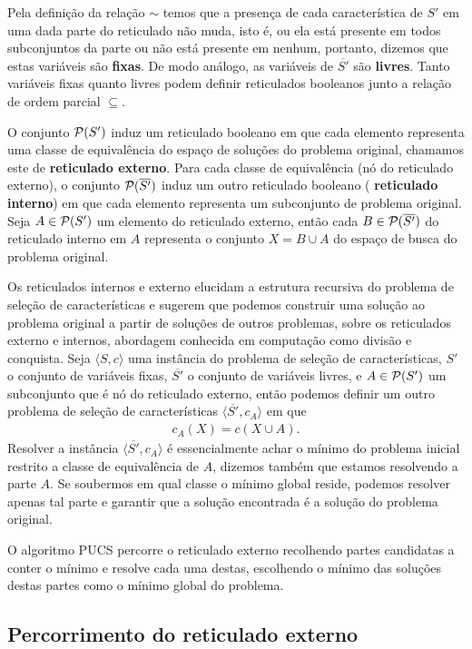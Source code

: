 Pela definição da relação $\sim$ temos que a presença de cada 
característica de $S'$ em uma dada parte do reticulado não muda, isto é,
ou ela está presente em todos subconjuntos da parte ou não está presente
em nenhum, portanto, dizemos que estas variáveis são {\bf fixas}. De 
modo análogo, as variáveis de $\overline{S'}$ são {\bf livres}. Tanto 
variáveis fixas quanto livres podem definir reticulados booleanos junto 
a relação de ordem parcial $\subseteq$.

O conjunto $\mathcal{P} (S')$ induz um reticulado booleano em que cada
elemento representa uma classe de equivalência do espaço de soluções
do problema original, chamamos este de {\bf reticulado externo}. Para 
cada classe de equivalência (nó do reticulado externo), o conjunto 
$\mathcal{P} (\overline {S'})$ induz um outro reticulado booleano ({\bf
reticulado interno}) em que cada elemento representa um subconjunto de
problema original. Seja $A \in \mathcal{P} (S')$ um elemento do reticulado 
externo, então cada $B \in \mathcal{P} (\overline{S'})$ do reticulado 
interno em $A$ representa o conjunto $X = B \cup A$ do espaço de busca
do problema original.

Os reticulados internos e externo elucidam a estrutura recursiva do 
problema de seleção de características e sugerem que podemos construir 
uma solução ao problema original a partir de soluções de outros 
problemas, sobre os reticulados externo e internos, abordagem conhecida
em computação como divisão e conquista. Seja $\langle S, c \rangle$ uma 
instância do problema de seleção de características, $S'$ o conjunto de 
variáveis fixas, $\overline{S'}$ o conjunto de variáveis livres, e 
$A \in \mathcal{P} (S')$ um subconjunto que é nó do reticulado externo, 
então podemos definir um outro problema de seleção de características 
$\langle \overline{S'}, c_{A} \rangle$ em que 
\begin{align*}
    c_{A} (X) = c (X \cup A).
\end{align*}
Resolver a instância $\langle \overline{S'}, c_{A} \rangle$ é 
essencialmente achar o mínimo do problema inicial restrito a classe de
equivalência de $A$, dizemos também que estamos resolvendo a parte $A$. 
Se soubermos em qual classe o mínimo global reside, podemos resolver 
apenas tal parte e garantir que a solução encontrada é a solução do 
problema original.

O algoritmo PUCS percorre o reticulado externo recolhendo partes 
candidatas a conter o mínimo e resolve cada uma destas, escolhendo o 
mínimo das soluções destas partes como o mínimo global do problema.

\subsection{Percorrimento do reticulado externo}
